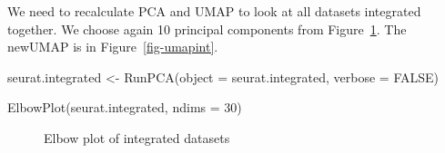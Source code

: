 \documentclass[
  letterpaper,
  DIV=11,
  numbers=noendperiod]{scrartcl}
\newenvironment{Shaded}{}{}
\newcommand{\AttributeTok}[1]{\textcolor[rgb]{0.49,0.56,0.16}{#1}}
\newcommand{\ConstantTok}[1]{\textcolor[rgb]{0.53,0.00,0.00}{#1}}
\newcommand{\DecValTok}[1]{\textcolor[rgb]{0.25,0.63,0.44}{#1}}
\newcommand{\FunctionTok}[1]{\textcolor[rgb]{0.02,0.16,0.49}{#1}}
\newcommand{\NormalTok}[1]{#1}
\newcommand{\OtherTok}[1]{\textcolor[rgb]{0.00,0.44,0.13}{#1}}
\begin{document}
We need to recalculate PCA and UMAP to look at all datasets integrated
together. We choose again 10 principal components from
Figure~\ref{fig-elbowint}. The newUMAP is in Figure~\ref{fig-umapint}.

\begin{Shaded}
\begin{Highlighting}[]
\NormalTok{seurat.integrated }\OtherTok{\textless{}{-}} \FunctionTok{RunPCA}\NormalTok{(}\AttributeTok{object =}\NormalTok{ seurat.integrated, }\AttributeTok{verbose =} \ConstantTok{FALSE}\NormalTok{)}
\end{Highlighting}
\end{Shaded}

\begin{Shaded}
\begin{Highlighting}[]
\FunctionTok{ElbowPlot}\NormalTok{(seurat.integrated, }\AttributeTok{ndims =} \DecValTok{30}\NormalTok{)}
\end{Highlighting}
\end{Shaded}

\begin{figure}[H]


\caption{\label{fig-elbowint}Elbow plot of integrated datasets}

\end{figure}%
\end{document}
